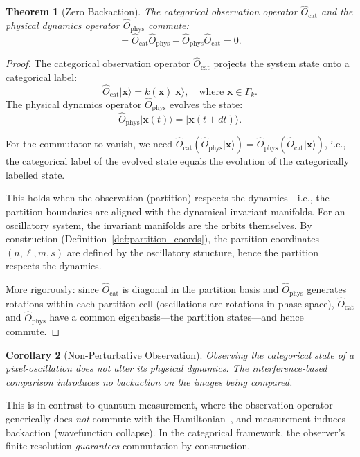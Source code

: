 \documentclass[11pt,twocolumn,a4paper]{article}
\newtheorem{theorem}{Theorem}[section]
\newtheorem{corollary}[theorem]{Corollary}
\newcommand{\Ocat}{\hat{O}_{\mathrm{cat}}}
\newcommand{\Ophys}{\hat{O}_{\mathrm{phys}}}
\begin{document}
\begin{theorem}[Zero Backaction]\label{thm:zero_backaction}
The categorical observation operator $\Ocat$ and the physical dynamics operator $\Ophys$ commute:
\begin{equation}
    [\Ocat, \Ophys] = \Ocat \Ophys - \Ophys \Ocat = 0.
    \label{eq:commutation}
\end{equation}
\end{theorem}

\begin{proof}
The categorical observation operator $\Ocat$ projects the system state onto a categorical label:
\begin{equation}
    \Ocat |\bm{x}\rangle = k(\bm{x}) |\bm{x}\rangle, \quad \text{where } \bm{x} \in \Gamma_k.
\end{equation}
The physical dynamics operator $\Ophys$ evolves the state:
\begin{equation}
    \Ophys |\bm{x}(t)\rangle = |\bm{x}(t + dt)\rangle.
\end{equation}

For the commutator to vanish, we need $\Ocat (\Ophys |\bm{x}\rangle) = \Ophys (\Ocat |\bm{x}\rangle)$, i.e., the categorical label of the evolved state equals the evolution of the categorically labelled state.

This holds when the observation (partition) respects the dynamics---i.e., the partition boundaries are aligned with the dynamical invariant manifolds. For an oscillatory system, the invariant manifolds are the orbits themselves. By construction (Definition~\ref{def:partition_coords}), the partition coordinates $(n, \ell, m, s)$ are defined by the oscillatory structure, hence the partition respects the dynamics.

More rigorously: since $\Ocat$ is diagonal in the partition basis and $\Ophys$ generates rotations within each partition cell (oscillations are rotations in phase space), $\Ocat$ and $\Ophys$ have a common eigenbasis---the partition states---and hence commute.
\end{proof}

\begin{corollary}[Non-Perturbative Observation]\label{cor:non_perturbative}
Observing the categorical state of a pixel-oscillation does not alter its physical dynamics. The interference-based comparison introduces no backaction on the images being compared.
\end{corollary}

This is in contrast to quantum measurement, where the observation operator generically does \emph{not} commute with the Hamiltonian~\citep{heisenberg1927, vonneumann1955}, and measurement induces backaction (wavefunction collapse). In the categorical framework, the observer's finite resolution \emph{guarantees} commutation by construction.
\end{document}
